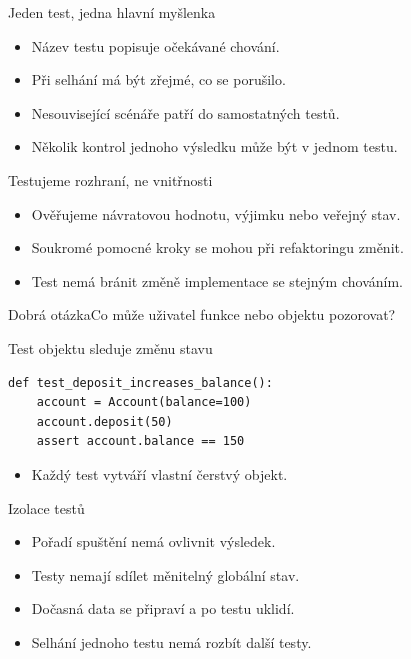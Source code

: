 \documentclass[aspectratio=169]{beamer}
\begin{document}
\begin{frame}{Jeden test, jedna hlavní myšlenka}
\begin{itemize}
\item Název testu popisuje očekávané chování.
\item Při selhání má být zřejmé, co se porušilo.
\item Nesouvisející scénáře patří do samostatných testů.
\item Několik kontrol jednoho výsledku může být v jednom testu.
\end{itemize}
\end{frame}

\begin{frame}{Testujeme rozhraní, ne vnitřnosti}
\begin{itemize}
\item Ověřujeme návratovou hodnotu, výjimku nebo veřejný stav.
\item Soukromé pomocné kroky se mohou při refaktoringu změnit.
\item Test nemá bránit změně implementace se stejným chováním.
\end{itemize}
\begin{block}{Dobrá otázka}Co může uživatel funkce nebo objektu pozorovat?\end{block}
\end{frame}

\begin{frame}[fragile]{Test objektu sleduje změnu stavu}
\begin{lstlisting}[style=python]
def test_deposit_increases_balance():
    account = Account(balance=100)
    account.deposit(50)
    assert account.balance == 150
\end{lstlisting}
\begin{itemize}\item Každý test vytváří vlastní čerstvý objekt.\end{itemize}
\end{frame}

\begin{frame}{Izolace testů}
\begin{itemize}
\item Pořadí spuštění nemá ovlivnit výsledek.
\item Testy nemají sdílet měnitelný globální stav.
\item Dočasná data se připraví a po testu uklidí.
\item Selhání jednoho testu nemá rozbít další testy.
\end{itemize}
\end{frame}
\end{document}
